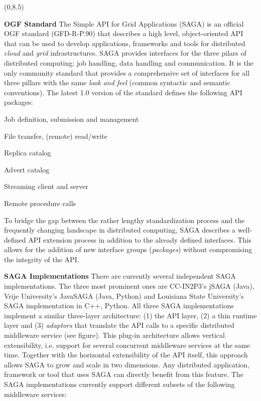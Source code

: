\documentclass[a0b,portrait]{a0poster}
\def\LHead#1{\bigskip\bigskip\noindent{\huge\color{HeadColor} #1}\smallskip}
\begin{document}
\begin{textblock}{7}(0,8.5)

\LHead{What is SAGA?}
\large

\textbf{\color{DarkBlue} OGF Standard } The Simple API for Grid
Applications (SAGA) is an official OGF standard (GFD-R-P.90) that
describes a high level, object-oriented API that can be used to
develop applications, frameworks and tools for distributed
\textit{cloud} and \textit{grid} infrastructures. SAGA provides
interfaces for the three pilars of distributed computing: job
handling, data handling and communication. It is the only community
standard that provides a comprehensive set of interfaces for all three
pillars with the same \textit{look and feel} (common syntactic and
semantic conventions).  The latest 1.0 version of the standard defines
the following API packages:
\begin{list}{}{\leftmargin=1.6em}
\item{Job definition, submission and management }
\item{File transfer, (remote) read/write } 
\item{Replica catalog }
\item{Advert catalog } 
\item{Streaming client and server }
\item{Remote procedure calls } 
\end{list}

To bridge the gap between the rather lengthy standardization process and the
frequently changing landscape in distributed computing, SAGA describes a
well-defined API extension process in addition to the already defined
interfaces. This allows for the addition of new interface groups
(\textit{packages}) without compromising the integrity of the API. 

\textbf{\color{DarkBlue} SAGA Implementations } There are currently
several independent SAGA implementations. The three most prominent
ones are CC-IN2P3's jSAGA (Java), Vrije University's JavaSAGA (Java,
Python) and Louisiana State University's SAGA implementation in C++,
Python. All three SAGA implementations implement a similar three-layer
architecture: (1) the API layer, (2) a thin runtime layer and (3)
\textit{adaptors} that translate the API calls to a specific
distributed middleware service (see figure). This plug-in architecture
allows vertical extensibility, i.e. support for several concurrent
middleware services at the same time. Together with the horizontal
extensibility of the API itself, this approach allows SAGA to grow and
scale in two dimensions. Any distributed application, framework or
tool that uses SAGA can directly benefit from this feature. The SAGA
implementations currently support different subsets of the following
middleware services:


\end{textblock}
\end{document}

